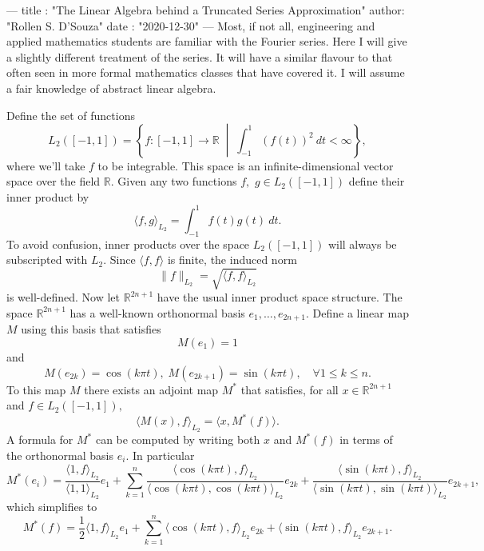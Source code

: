 ---
title :   "The Linear Algebra behind a Truncated Series Approximation"
author:   "Rollen S. D'Souza"
date  :   "2020-12-30"
---
Most, if not all, engineering and applied mathematics students are familiar with the Fourier series.
Here I will give a slightly different treatment of the series.
It will have a similar flavour to that often seen in more formal mathematics classes that have covered it.
I will assume a fair knowledge of abstract linear algebra.

Define the set of functions
\[
  L_2([-1, 1])
    =
      \left\{
        f: [-1, 1] \to \mathbb{R}
        \;\middle|\;
        \int_{-1}^{1} (f(t))^2 ~dt < \infty
      \right\},
\]
where we'll take \(f\) to be integrable.
This space is an infinite-dimensional vector space over the field \(\mathbb{R}.\)
Given any two functions \(f,\) \(g\in L_2([-1, 1])\) define their inner product by
\[
  \langle f, g \rangle_{L_2} = \int_{-1}^{1} f(t) g(t)~dt.
\]
To avoid confusion, inner products over the space \(L_2([-1, 1])\) will always be subscripted with \(L_2.\)
Since \(\langle f, f \rangle\) is finite, the induced norm
\[
  \|f\|_{L_2} = \sqrt{\langle f, f \rangle_{L_2}}
\]
is well-defined.
%
Now let \(\mathbb{R}^{2n+1}\) have the usual inner product space structure.
The space \(\mathbb{R}^{2n+1}\) has a well-known orthonormal basis \(e_1, \ldots, e_{2n+1}.\)
Define a linear map \(M\) using this basis that satisfies
\[
  M(e_1) = 1
\]
and
\[
  M(e_{2k}) = \cos(k \pi t),\; M(e_{2k+1}) = \sin(k \pi t),\quad \forall 1\leq k\leq n.
\]
To this map \(M\) there exists an adjoint map \(M^*\) that satisfies, for all \(x \in \mathbb{R}^{2n+1}\) and \(f \in L_2([-1, 1]),\)
\[
  \langle M(x), f \rangle_{L_2}
  =
  \langle x, M^*(f) \rangle.
\]
A formula for \(M^*\) can be computed by writing both \(x\) and \(M^*(f)\) in terms of the orthonormal basis \(e_i.\)
In particular
\[
  M^*(e_i)
    =
      \frac{\langle 1, f \rangle_{L_2}}{\langle 1, 1\rangle_{L_2}} e_1
      +
      \sum_{k = 1}^{n}
        \frac{\langle \cos(k \pi t), f \rangle_{L_2}}{\langle \cos(k \pi t), \cos(k \pi t)\rangle_{L_2}}
        e_{2k}
        +
        \frac{\langle \sin(k \pi t), f \rangle_{L_2}}{\langle \sin(k \pi t), \sin(k \pi t)\rangle_{L_2}}
        e_{2k+1},
\]
which simplifies to
\[
  M^*(f)
    =
      \frac{1}{2}\langle 1, f \rangle_{L_2} e_1
      +
      \sum_{k = 1}^{n}
        \langle \cos(k \pi t), f \rangle_{L_2}
        e_{2k}
        +
        \langle \sin(k \pi t), f \rangle_{L_2}
        e_{2k+1}.
\]

